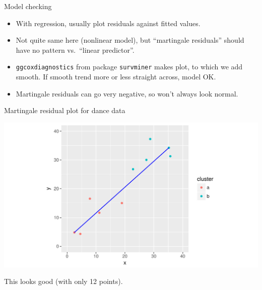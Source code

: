 \begin{frame}[fragile]{Model checking}
  
  \begin{itemize}
  \item With regression, usually plot residuals against fitted values.
  \item Not quite same here (nonlinear model), but ``martingale
    residuals'' should have no pattern vs.\ ``linear predictor''.
  \item \texttt{ggcoxdiagnostics} from package \texttt{survminer}
    makes plot, to which we add smooth. If smooth trend more or less
    straight across, model OK. 
  \item Martingale residuals can go very negative, so won't always
    look normal.
  \end{itemize}
  
\end{frame}

\begin{frame}[fragile]{Martingale residual plot for dance data}
  
\begin{knitrout}
\color{fgcolor}\begin{kframe}
\begin{alltt}
\hlopt{+}\hlstd{(}
\end{alltt}


{\ttfamily\noindent\itshape\color{messagecolor}{\#\# `geom\_smooth()` using method = 'loess'}}\end{kframe}
\includegraphics[width=\maxwidth]{figure/unnamed-chunk-4-1} 

\end{knitrout}

This looks good (with only 12 points).
  
\end{frame}

